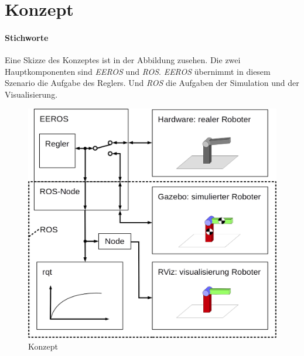 \chapter{Konzept}
\subsubsection*{Stichworte}

Eine Skizze des Konzeptes ist in der Abbildung %
zusehen.
Die zwei Hauptkomponenten sind \textit{EEROS} und \textit{ROS}.
\textit{EEROS} übernimmt in diesem Szenario die Aufgabe des Reglers.
Und \textit{ROS} die Aufgaben der Simulation und der Visualisierung.

\begin{figure}[ht!]
	\centering
	\includegraphics[width=14.5cm]{images/Konzept.png}
	\caption{Konzept}
	\label{Ab:konzept}
\end{figure}

